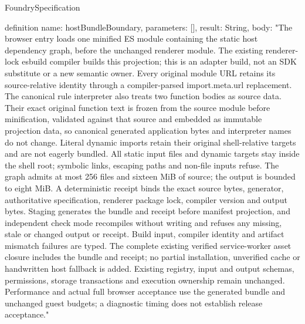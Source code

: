 \begin{lexlean}{FoundrySpecification}
\begin{semanticmodule}
definition{
  name: hostBundleBoundary,
  parameters: [],
  result: String,
  body: "The browser entry loads one minified ES module containing the static host dependency graph, before the unchanged renderer module. The existing renderer-lock esbuild compiler builds this projection; this is an adapter build, not an SDK substitute or a new semantic owner. Every original module URL retains its source-relative identity through a compiler-parsed import.meta.url replacement. The canonical rule interpreter also treats two function bodies as source data. Their exact original function text is frozen from the source module before minification, validated against that source and embedded as immutable projection data, so canonical generated application bytes and interpreter names do not change. Literal dynamic imports retain their original shell-relative targets and are not eagerly bundled. All static input files and dynamic targets stay inside the shell root; symbolic links, escaping paths and non-file inputs refuse. The graph admits at most 256 files and sixteen MiB of source; the output is bounded to eight MiB. A deterministic receipt binds the exact source bytes, generator, authoritative specification, renderer package lock, compiler version and output bytes. Staging generates the bundle and receipt before manifest projection, and independent check mode recompiles without writing and refuses any missing, stale or changed output or receipt. Build input, compiler identity and artifact mismatch failures are typed. The complete existing verified service-worker asset closure includes the bundle and receipt; no partial installation, unverified cache or handwritten host fallback is added. Existing registry, input and output schemas, permissions, storage transactions and execution ownership remain unchanged. Performance and actual full browser acceptance use the generated bundle and unchanged guest budgets; a diagnostic timing does not establish release acceptance."
}


\end{semanticmodule}
\end{lexlean}
